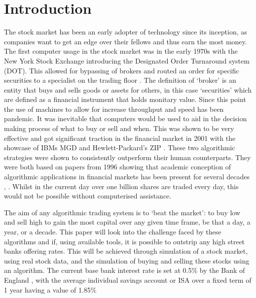 \documentclass[conference]{IEEEtran}
\begin{document}

\section{Introduction}

The stock market has been an early adopter of technology since its inception, as companies want to get an edge over their fellows and thus earn the most money. The first computer usage in the stock market was in the early 1970s with the New York Stock Exchange introducing  the Designated Order Turnaround system (DOT). This allowed for bypassing of brokers and routed an order for specific securities to a specialist on the trading floor \cite{Hasbrouck}. The definition of `broker' is an entity that buys and sells goods or assets for others, in this case `securities' which are defined as a financial instrument that holds monitary value. Since this point the use of machines to allow for increase throughput and speed has been pandemic. It was inevitable that computers would be used to aid in the decision making process of what to buy or sell and when. This was shown to be very effective and got significant traction in the financial market in 2001 with the showcase of IBMs MGD and  Hewlett-Packard's ZIP \cite{Tesauro2001}. These two algorithmic strategies were shown to consistently outperform their human counterparts. They were both based on papers from 1996 showing that academic conception of algorithmic applications in financial markets has been present for several decades \cite{Gjerstad1998}, \cite{Cliff1998}. Whilst in the current day over one billion shares are traded every day, this would not be possible without computerised assistance. 

The aim of any algorithmic trading system is to `beat the market': to buy low and sell high to gain the most capital over any given time frame, be that a day, a year, or a decade. This paper will look into the challenge faced by these algorithms and if, using available tools, it is possible to outstrip any high street banks offering rates. This will be achieved through simulation of a stock market, using real stock data, and the simulation of buying and selling these stocks using an algorithm. The current base bank interest rate is set at 0.5\% by the Bank of England \cite{BankofEngland2014}, with the average individual savings account or ISA over a fixed term of 1 year having a value of 1.85\% \cite{Murray2018}
\end{document}
